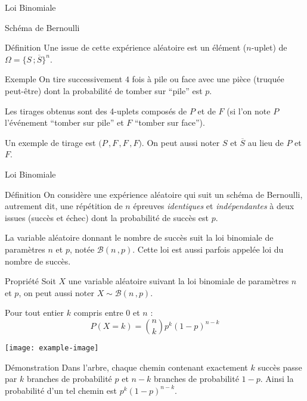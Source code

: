 \documentclass{cours}
\begin{document}
\begin{Gpartie}{Loi Binomiale}
\begin{Spartie}{Schéma de Bernoulli}
\begin{SSpartie}{Définition}
                Une issue de cette expérience aléatoire est un élément ($n$-uplet) de $\Omega=\big\{S\,;\overline{S}\big\}^n$.
            \end{SSpartie}
            \begin{SSpartie}{Exemple} 
                On tire successivement $4$ fois à pile ou face avec une pièce (truquée peut-être) dont la probabilité de tomber sur ``pile'' est $p$. 
                
                Les tirages obtenus sont des 4-uplets composés de $P$ et de $F$ (si l'on note $P$ l'événement ``tomber sur pile'' et $F$ ``tomber sur face'').
                
                Un exemple de tirage est $\big(P\,, F\,, F\,, F\big)$. On peut aussi noter $S$ et $\overline{S}$ au lieu de $P$ et $F$.
            \end{SSpartie}
        \end{Spartie}
        \pagebreak
        \begin{Spartie}{Loi Binomiale} 
            \begin{SSpartie}{Définition} 
                On considère une expérience aléatoire qui suit un schéma de Bernoulli, autrement dit, une répétition de $n$ épreuves \emph{identiques} et \emph{indépendantes} à deux issues (succès et échec) dont la probabilité de succès est $p$.

                La variable aléatoire donnant le nombre de succès suit la loi binomiale de paramètres $n$ et $p$, notée $\mathcal{B}(n\,, p)$. Cette loi est aussi parfois appelée loi du nombre de succès.
            \end{SSpartie}
            \begin{SSpartie}{Propriété} 
                Soit $X$ une variable aléatoire suivant la loi binomiale de paramètres $n$ et $p$, on peut aussi noter $X\sim\mathcal{B}(n\,, p)$.

                Pour tout entier $k$ compris entre $0$ et $n$ :
                \[P(X=k)=\binom{n}{k}p^k(1-p)^{n-k}\]

                \begin{center}
                        \texttt{[image: example-image]}
                    \parbox{\linewidth}{}
                \end{center}
                \pagebreak
                \begin{SSSpartie}{Démonstration} 
                    Dans l'arbre, chaque chemin contenant exactement $k$ succès passe par $k$ branches de probabilité $p$ et $n-k$ branches de probabilité $1-p$. Ainsi la probabilité d'un tel chemin est $p^k(1-p)^{n-k}$.


\end{SSSpartie}
\end{SSpartie}
\end{Spartie}
\end{Gpartie}
\end{document}

